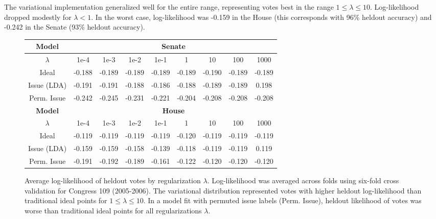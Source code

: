 The variational implementation generalized well for the entire range,
representing votes best in the range $1 \le \lambda \le 10$.
Log-likelihood dropped modestly for $\lambda < 1$.  In the worst case,
log-likelihood was -0.159 in the House (this corresponds with 96\%
heldout accuracy) and -0.242 in the Senate (93\% heldout accuracy).

\begin{figure}
  \caption{Average log-likelihood of heldout votes by regularization
    $\lambda$. Log-likelihood was averaged across folds using six-fold
    cross validation for Congress 109 (2005-2006).  The variational
    distribution represented votes with higher heldout log-likelihood
    than traditional ideal points for $1 \le \lambda \le 10$. In a
    model fit with permuted issue labels (Perm. Issue), heldout
    likelihood of votes was worse than traditional ideal points for
    all regularizations $\lambda$.
  } \center
  \begin{tabular}{|c|cccccccc|}
    \hline
    \textbf{Model} & \multicolumn{8}{|c|}{\textbf{Senate}} \\
    \hline
    \textbf{$\lambda$}
    & 1e-4
    &  1e-3 
    &  1e-2 
    &  1e-1 
    &  1 
    &  10 
    &  100
    &  1000  \\
    \hline
    Ideal
    &  -0.188 %
    &  -0.189 
    &  -0.189 %
    &  -0.189
    &  -0.189 %
    &  -0.190 %
    &  -0.189
    &  -0.189  \\ %
    Issue (LDA)
    & -0.191 %
    & -0.191
    & -0.188 %
    & -0.186 %
    & -0.188 %
    & -0.189
    & -0.189 %
    & 0.198 \\ 
     Perm. Issue 
    &  -0.242 
    &  -0.245 
    &  -0.231 
    &  -0.221 
    &  -0.204 
    &  -0.208 
    &  -0.208 
    &  -0.208  \\
    \hline
    \hline
    \textbf{Model} & \multicolumn{8}{|c|}{\textbf{House}} \\
    \hline
    \textbf{$\lambda$}
    & 1e-4
    &  1e-3 
    &  1e-2 
    &  1e-1 
    &  1 
    &  10 
    &  100
    &  1000  \\
    \hline
    Ideal
    &  -0.119 %
    &  -0.119 
    &  -0.119 %
    &  -0.119
    &  -0.120 %
    &  -0.119 %
    &  -0.119
    &  -0.119  \\ %
    Issue (LDA)
    & -0.159 %
    & -0.159
    & -0.158 %
    & -0.139 %
    & -0.118 %
    & -0.119
    & -0.119 %
    & 0.119 \\ 
     Perm. Issue 
    &  -0.191 
    &  -0.192 
    &  -0.189 
    &  -0.161 
    &  -0.122 
    &  -0.120 
    &  -0.120 
    &  -0.120  \\
    \hline
  \end{tabular}
  \normalsize
  \label{fig:lambda_comparison}
\end{figure}

